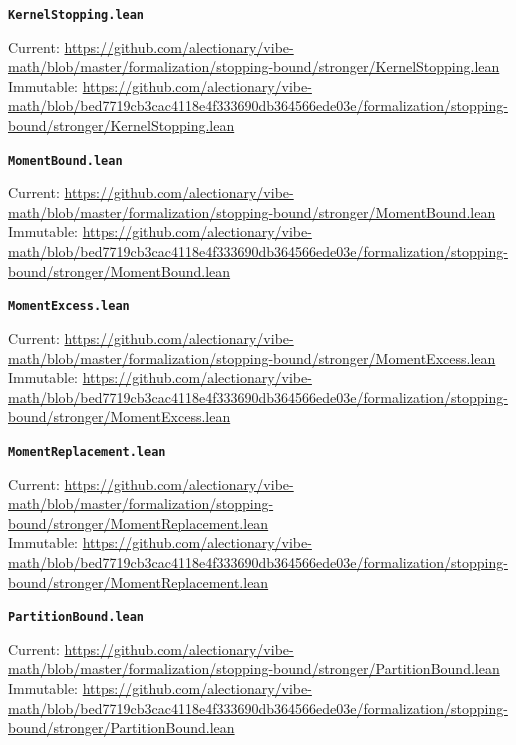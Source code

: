 \smallskip
\medskip
\par\noindent\textbf{\texttt{KernelStopping.lean}}\par\nopagebreak
{\footnotesize\noindent Current: \url{https://github.com/alectionary/vibe-math/blob/master/formalization/stopping-bound/stronger/KernelStopping.lean}\\
Immutable: \url{https://github.com/alectionary/vibe-math/blob/bed7719cb3cac4118e4f333690db364566ede03e/formalization/stopping-bound/stronger/KernelStopping.lean}\par}
\smallskip
\medskip
\par\noindent\textbf{\texttt{MomentBound.lean}}\par\nopagebreak
{\footnotesize\noindent Current: \url{https://github.com/alectionary/vibe-math/blob/master/formalization/stopping-bound/stronger/MomentBound.lean}\\
Immutable: \url{https://github.com/alectionary/vibe-math/blob/bed7719cb3cac4118e4f333690db364566ede03e/formalization/stopping-bound/stronger/MomentBound.lean}\par}
\smallskip
\medskip
\par\noindent\textbf{\texttt{MomentExcess.lean}}\par\nopagebreak
{\footnotesize\noindent Current: \url{https://github.com/alectionary/vibe-math/blob/master/formalization/stopping-bound/stronger/MomentExcess.lean}\\
Immutable: \url{https://github.com/alectionary/vibe-math/blob/bed7719cb3cac4118e4f333690db364566ede03e/formalization/stopping-bound/stronger/MomentExcess.lean}\par}
\smallskip
\medskip
\par\noindent\textbf{\texttt{MomentReplacement.lean}}\par\nopagebreak
{\footnotesize\noindent Current: \url{https://github.com/alectionary/vibe-math/blob/master/formalization/stopping-bound/stronger/MomentReplacement.lean}\\
Immutable: \url{https://github.com/alectionary/vibe-math/blob/bed7719cb3cac4118e4f333690db364566ede03e/formalization/stopping-bound/stronger/MomentReplacement.lean}\par}
\smallskip
\medskip
\par\noindent\textbf{\texttt{PartitionBound.lean}}\par\nopagebreak
{\footnotesize\noindent Current: \url{https://github.com/alectionary/vibe-math/blob/master/formalization/stopping-bound/stronger/PartitionBound.lean}\\
Immutable: \url{https://github.com/alectionary/vibe-math/blob/bed7719cb3cac4118e4f333690db364566ede03e/formalization/stopping-bound/stronger/PartitionBound.lean}\par}
